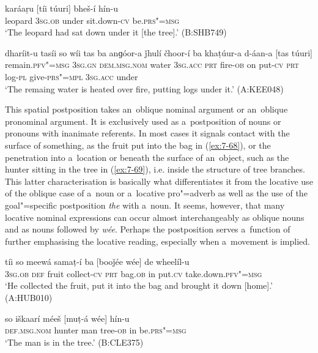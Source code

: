 \begin{exe}
\ex
\label{ex:7-66}
\gll karáaṛu [tíi túuri] bheš-í hín-u \\
leopard \textsc{3sg.ob} under sit.down-\textsc{cv} be.\textsc{prs"=msg } \\
\glt `The leopard had sat down under it [the tree].' (B:SHB749)
\end{exe}
\begin{exe}
\ex
\label{ex:7-67}
\gll dharíit-u tasíi so wíi tas ba anɡóor-a ǰhulí čhoor-í ba
khaṭúur-a d-áan-a [tas túuri] \\
remain.\textsc{pfv"=msg} \textsc{3sg.gn} \textsc{dem.msg.nom} water \textsc{3sg.acc} \textsc{prt}  fire-\textsc{ob} on put-\textsc{cv} \textsc{prt} log-\textsc{pl} give-\textsc{prs"=mpl } \textsc{3sg.acc} under   \\
\glt `The remaing water is heated over fire, putting logs under it.' (A:KEE048)
\end{exe}

 This spatial postposition takes an~oblique nominal argument or an~oblique pronominal argument. It is exclusively used as a~postposition of nouns or pronouns with inanimate referents. In most cases it signals contact with the surface of something, as the fruit put into the bag in (\ref{ex:7-68}), or the penetration into a~location or beneath the surface of an~object, such as the hunter sitting in the tree in (\ref{ex:7-69}), i.e. inside the structure of tree branches. This latter characterisation is basically what differentiates it from the locative use of the oblique case of a~noun or a~locative pro"=adverb as well as the use of the goal"=specific postposition \textit{the} with a~noun. It seems, however, that many locative nominal expressions can occur almost interchangeably as oblique nouns and as nouns followed by \textit{wée}. Perhaps the postposition serves a~function of further emphasising the locative reading, especially when a~movement is implied.

\begin{exe}
\ex
\label{ex:7-68}
\gll tíi so meewá samaṭ-í ba [booǰée wée] de wheelíl-u \\
\textsc{3sg.ob} \textsc{def} fruit collect-\textsc{cv} \textsc{prt} bag.\textsc{ob} in  put.\textsc{cv} take.down.\textsc{pfv"=msg } \\
\glt `He collected the fruit, put it into the bag and brought it down [home].' (A:HUB010)
\end{exe}
\begin{exe}
\ex
\label{ex:7-69}
\gll so iškaarí méeš [muṭ-á wée] hín-u \\
\textsc{def.msg.nom} hunter man tree-\textsc{ob} in be.\textsc{prs"=msg} \\
\glt `The man is in the tree.' (B:CLE375)
\end{exe}

